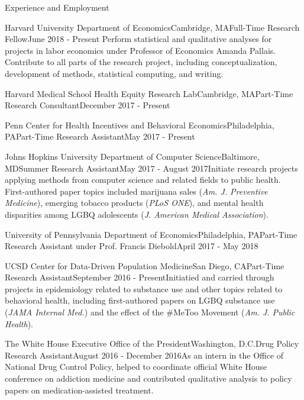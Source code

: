 \documentclass{resume} %
\begin{document}
\begin{rSection}{Experience and Employment}
\begin{rSubsection}{Harvard University Department of Economics}{Cambridge, MA}{Full-Time Research Fellow}{June 2018 - Present}
Perform statistical and qualitative analyses for projects in labor economics under Professor of Economics Amanda Pallais. Contribute to all parts of the research project, including conceptualization, development of methods, statistical computing, and writing.
\end{rSubsection}
\begin{rSubsection}{Harvard Medical School Health Equity Research Lab}{Cambridge, MA}{Part-Time Research Consultant}{December 2017 - Present}
\end{rSubsection}
\begin{rSubsection}{Penn Center for Health Incentives and Behavioral Economics}{Philadelphia, PA}{Part-Time Research Assistant}{May 2017 - Present}
\end{rSubsection}
\begin{rSubsection}{Johns Hopkins University Department of Computer Science}{Baltimore, MD}{Summer Research Assistant}{May 2017 - August 2017}Initiate research projects applying methods from computer science and related fields to public health. First-authored paper topics included marijuana sales (\emph{Am. J. Preventive Medicine}), emerging tobacco products (\emph{PLoS ONE}), and mental health disparities among LGBQ adolescents (\emph{J. American Medical Association}).
\end{rSubsection}
\begin{rSubsection}{University of Pennsylvania Department of Economics}{Philadelphia, PA}{Part-Time Research Assistant under Prof. Francis Diebold}{April 2017 - May 2018}
\end{rSubsection}
\begin{rSubsection}{UCSD Center for Data-Driven Population Medicine}{San Diego, CA}{Part-Time Research Assistant}{September 2016 - Present}Initiatied and carried through projects in epidemiology related to substance use and other topics related to behavioral health, including first-authored papers on LGBQ substance use (\emph{JAMA Internal Med.}) and the effect of the \#MeToo Movement (\emph{Am. J. Public Health}).
\end{rSubsection}
\begin{rSubsection}{The White House Executive Office of the President}{Washington, D.C.}{Drug Policy Research Assistant}{August 2016 - December 2016}As an intern in the Office of National Drug Control Policy, helped to coordinate official White House conference on addiction medicine and contributed qualitative analysis to policy papers on medication-assisted treatment.

\end{rSubsection}
\end{rSection}
\end{document}
